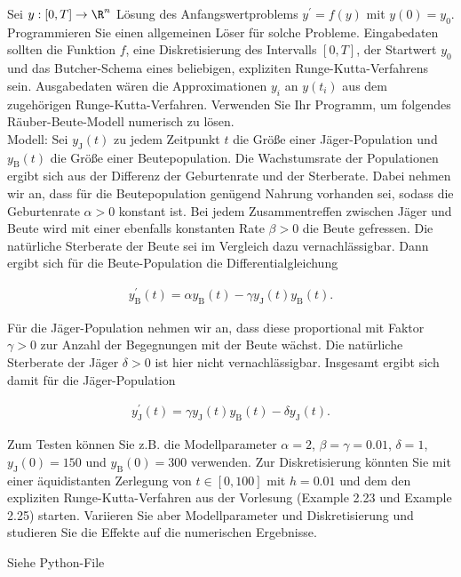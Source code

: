 \begin{exercise}

Sei $y: [0, T] \to \R^n$ Lösung des Anfangswertproblems $y^\prime = f(y)$ mit $y(0) = y_0$.
Programmieren Sie einen allgemeinen Löser für solche Probleme.
Eingabedaten sollten die Funktion $f$, eine Diskretisierung des Intervalls $[0, T]$, der Startwert $y_0$ und das Butcher-Schema eines beliebigen, expliziten Runge-Kutta-Verfahrens sein. Ausgabedaten wären die Approximationen $y_i$ an $y(t_i)$ aus dem zugehörigen Runge-Kutta-Verfahren.
Verwenden Sie Ihr Programm, um folgendes Räuber-Beute-Modell numerisch zu lösen. \\

Modell:
Sei $y_\mathrm{J}(t)$ zu jedem Zeitpunkt $t$ die Größe einer Jäger-Population und $y_\mathrm{B}(t)$ die Größe einer Beutepopulation.
Die Wachstumsrate der Populationen ergibt sich aus der Differenz der Geburtenrate und der Sterberate.
Dabei nehmen wir an, dass für die Beutepopulation genügend Nahrung vorhanden sei, sodass die Geburtenrate $\alpha > 0$ konstant ist.
Bei jedem Zusammentreffen zwischen Jäger und Beute wird mit einer ebenfalls konstanten Rate $\beta > 0$ die Beute gefressen.
Die natürliche Sterberate der Beute sei im Vergleich dazu vernachlässigbar.
Dann ergibt sich für die Beute-Population die Differentialgleichung

\begin{align}
  \label{Beute-Population}
  y_\mathrm{B}^\prime(t)
  =
  \alpha y_\mathrm{B}(t) - \gamma y_\mathrm{J}(t) y_\mathrm{B}(t).
  \tag{1a}
\end{align}

Für die Jäger-Population nehmen wir an, dass diese proportional mit Faktor $\gamma > 0$ zur Anzahl der Begegnungen mit der Beute wächst.
Die natürliche Sterberate der Jäger $\delta > 0$ ist hier nicht vernachlässigbar.
Insgesamt ergibt sich damit für die Jäger-Population

\begin{align}
  \label{Jäger-Population}
  y_\mathrm{J}^\prime(t)
  =
  \gamma y_\mathrm{J}(t) y_\mathrm{B}(t) - \delta y_\mathrm{J}(t).
  \tag{1b}
\end{align}

Zum Testen können Sie z.B. die Modellparameter $\alpha = 2$, $\beta = \gamma = 0.01$, $\delta = 1$, $y_\mathrm{J}(0) = 150$ und $y_\mathrm{B}(0) = 300$ verwenden.
Zur Diskretisierung könnten Sie mit einer äquidistanten Zerlegung von $t \in [0, 100]$ mit $h = 0.01$ und dem den expliziten Runge-Kutta-Verfahren aus der Vorlesung (Example 2.23 und Example 2.25) starten.
Variieren Sie aber Modellparameter und Diskretisierung
und studieren Sie die Effekte auf die numerischen Ergebnisse.

\end{exercise}

\begin{solution}

Siehe Python-File

\end{solution}
